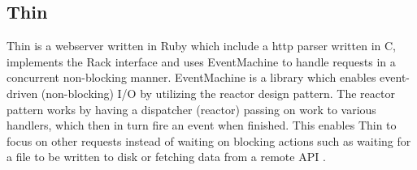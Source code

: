 \subsection{Thin}
Thin is a webserver written in Ruby which include a http parser written in C,
implements the Rack interface and uses EventMachine to handle requests in a
concurrent non-blocking manner. EventMachine is a library which enables
event-driven (non-blocking) I/O by utilizing the reactor design pattern. The
reactor pattern works by having a dispatcher (reactor) passing on work to
various handlers, which then in turn fire an event when finished. This enables
Thin to focus on other requests instead of waiting on blocking actions such as
waiting for a file to be written to disk or fetching data from a remote API
\cite{reactor}.


